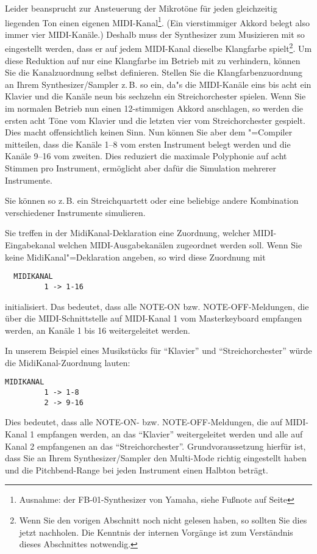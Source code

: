 Leider beansprucht \mutabor{} zur Ansteuerung der Mikrotöne für jeden 
gleichzeitig liegenden Ton einen eigenen 
MIDI-Kanal\footnote{Ausnahme: der FB-01-Synthesizer von Yamaha, 
siehe Fußnote auf Seite \pageref{FBNULLEINS}}. 
(Ein vierstimmiger Akkord belegt also immer vier MIDI-Kanäle.) 
Deshalb muss der Synthesizer zum Musizieren mit \mutabor{} so 
eingestellt werden, dass er auf jedem MIDI-Kanal dieselbe Klangfarbe 
spielt\footnote{Wenn Sie den vorigen Abschnitt noch nicht gelesen haben, 
so sollten Sie dies jetzt nachholen. Die Kenntnis der internen Vorgänge 
ist zum Verständnis dieses Abschnittes notwendig.}. 
Um diese Reduktion auf nur eine Klangfarbe im Betrieb mit \mutabor{} zu 
verhindern, können Sie die Kanalzuordnung selbst definieren. 
Stellen Sie die Klangfarbenzuordnung an Ihrem Synthesizer/Sampler z.\,B. 
so ein, da"s die MIDI-Kanäle eins bis acht ein Klavier und die Kanäle 
neun bis sechzehn ein Streichorchester spielen. Wenn Sie im normalen Betrieb 
nun einen 12-stimmigen Akkord anschlagen, so werden die ersten acht Töne 
vom Klavier und die letzten vier vom Streichorchester gespielt. 
Dies macht offensichtlich keinen Sinn. Nun können Sie aber dem 
\mutabor{}"=Compiler mitteilen, dass die Kanäle 1--8 vom ersten 
Instrument belegt werden und die Kanäle 9--16 vom zweiten. 
Dies reduziert die maximale Polyphonie auf acht Stimmen pro Instrument, 
ermöglicht aber dafür die Simulation mehrerer Instrumente.


Sie können so z.\,B. ein Streichquartett oder eine beliebige andere 
Kombination verschiedener Instrumente simulieren.

Sie treffen in der MidiKanal-Deklaration eine Zuordnung, welcher 
MIDI-Eingabekanal welchen MIDI-Ausgabekanälen zugeordnet werden soll. 
Wenn Sie keine MidiKanal"=Deklaration angeben, so wird diese Zuordnung mit
\begin{verbatim}
  MIDIKANAL
	     1 -> 1-16
\end{verbatim}
initialisiert. Das bedeutet, dass alle NOTE-ON bzw. NOTE-OFF-Meldungen, 
die über die MIDI-Schnittstelle auf MIDI-Kanal 1 vom Masterkeyboard 
empfangen werden, an Kanäle 1 bis 16 weitergeleitet werden. 

In unserem Beispiel eines Musikstücks für "`Klavier"' und
"`Streichorchester"' würde die MidiKanal-Zuordnung lauten:
\begin{verbatim}
MIDIKANAL
	     1 -> 1-8
	     2 -> 9-16
\end{verbatim}
Dies bedeutet, dass alle NOTE-ON- bzw. NOTE-OFF-Meldungen, die auf
MIDI-Kanal 1 empfangen werden, an das "`Klavier"' weitergeleitet werden
und alle auf Kanal 2 empfangenen an das "`Streichorchester"'.
Grundvoraussetzung hierfür ist, dass Sie an Ihrem Synthesizer/Sampler
den Multi-Mode richtig eingestellt haben und die Pitchbend-Range
bei jeden Instrument einen Halbton beträgt.



